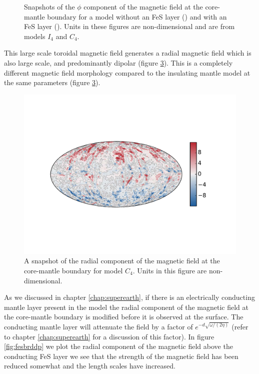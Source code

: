 \begin{figure}
\begin{subfigure}{.8\textwidth}
	        \caption{ \label{fig:fesbph}}
        \end{subfigure}
        \caption{Snapshots of the $\phi$ component of the magnetic field at the core-mantle boundary for a model without an FeS layer () and with an FeS layer (). Units in these figures are non-dimensional and are from models $I_4$ and $C_4$.} 
        \label{fig:bph}
\end{figure}

This large scale toroidal magnetic field generates a radial magnetic field which is also large scale, and predominantly dipolar (figure \ref{fig:fesbrcmb}). This is a completely different magnetic field morphology compared to the insulating mantle model at the same parameters (figure \ref{fig:fesbrcmb}).
\begin{figure}
	\centering
	\includegraphics[width=.8\linewidth]{Chapter5/Figures/br11_004_1631_100.pdf}	
	\caption{A snapshot of the radial component of the magnetic field at the core-mantle boundary for model $C_4$. Units in this figure are non-dimensional.}
	\label{fig:fesbrcmb}
\end{figure}
As we discussed in chapter \ref{chap:superearth}, if there is an electrically conducting mantle layer present in the model the radial component of the magnetic field at the core-mantle boundary is modified before it is observed at the surface. The conducting mantle layer will attenuate the field by a factor of $e^{-d\sqrt{\omega/(2 \eta)}}$ (refer to chapter \ref{chap:superearth} for a discussion of this factor). In figure \ref{fig:fesbrddp} we plot the radial component of the magnetic field above the conducting FeS layer we see that the strength of the magnetic field has been reduced somewhat and the length scales have increased.
